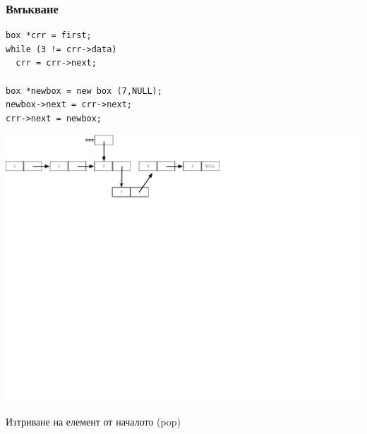 \documentclass{beamer}
\begin{document}
\begin{frame}[fragile]
\frametitle{Вмъкване}

\begin{flushleft}
\begin{lstlisting}
box *crr = first;
while (3 != crr->data)
  crr = crr->next;

box *newbox = new box (7,NULL);
newbox->next = crr->next;
crr->next = newbox;
\end{lstlisting}  
\end{flushleft}


\includegraphics[width=14.0cm]{images/05_ll_insert_secondlink}

\end{frame}



\begin{frame}
\centerline{Изтриване на елемент от началото (pop)}
\end{frame}
\end{document}
